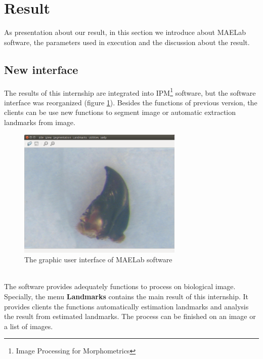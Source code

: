\section{Result}
As presentation about our result, in this section we introduce about MAELab software, the parameters used in execution and the discussion about the result.
\subsection{New interface}
The results of this internship are integrated into IPM\footnote{Image Processing for Morphometrics} software, but the software interface was reorganized (figure \ref{fig:44}). Besides the functions of previous version, the clients can be use new functions to segment image or automatic extraction landmarks from image.
\begin{figure}[h!]
\centering
\includegraphics[width=0.7\textwidth]{./images/software}
\caption{The graphic user interface of MAELab software}
\label{fig:44}
\end{figure}~\\
The software provides adequately functions to process on biological image. Specially, the menu \textbf{Landmarks} contains the main result of this internship. It provides clients the functions automatically estimation landmarks and analysis the result from estimated landmarks. The process can be finished on an image or a list of images.
